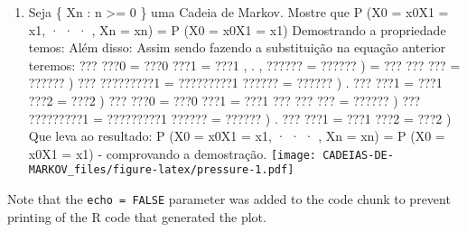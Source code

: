 \documentclass[
]{article}
\providecommand{\tightlist}{%
  \setlength{\itemsep}{0pt}\setlength{\parskip}{0pt}}
\begin{document}
\begin{enumerate}
\def\labelenumi{\arabic{enumi}.}
\setcounter{enumi}{1}
\tightlist
\item
  Seja \{ Xn : n \textgreater= 0 \} uma Cadeia de Markov. Mostre que P
  (X0 = x0\textbar X1 = x1, · · · , Xn = xn) = P (X0 = x0\textbar X1 =
  x1) Demostrando a propriedade temos: Além disso: Assim sendo fazendo a
  substituição na equação anterior teremos: ??? ???0 = ???0 ???1 = ???1
  , . , ?????? = ?????? ) = ??? ??? ??? = ?????? ) ??? ?????????1 =
  ?????????1 ?????? = ?????? ) . ??? ???1 = ???1 ???2 = ???2 ) ??? ???0
  = ???0 ???1 = ???1 ??? ??? ??? = ?????? ) ??? ?????????1 = ?????????1
  ?????? = ?????? ) . ??? ???1 = ???1 ???2 = ???2 ) Que leva ao
  resultado: P (X0 = x0\textbar X1 = x1, · · · , Xn = xn) = P (X0 =
  x0\textbar X1 = x1) - comprovando a demostração.
  \texttt{[image: CADEIAS-DE-MARKOV\_files/figure-latex/pressure-1.pdf]}
\end{enumerate}

Note that the \texttt{echo\ =\ FALSE} parameter was added to the code
chunk to prevent printing of the R code that generated the plot.
\end{document}
